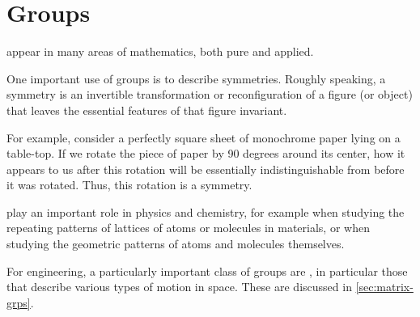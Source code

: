 
\section{Groups}
\label{sec:groups}

 appear in many areas of mathematics, both pure and applied.

One important use of groups is to describe symmetries.
Roughly speaking, a symmetry is an invertible transformation or reconfiguration of a figure (or object) that leaves the essential features of that figure invariant.

For example, consider a perfectly square sheet of monochrome paper lying on a table-top.
If we rotate the piece of paper by 90 degrees around its center, how it appears to us after this rotation will be essentially indistinguishable from before it was rotated.
Thus, this rotation is a symmetry.

 play an important role in physics and chemistry, for example when studying the repeating patterns of lattices of atoms or molecules in materials, or when studying the geometric patterns of atoms and molecules themselves.

For engineering, a particularly important class of groups are , in particular those that describe various types of motion in space.
These are discussed in \cref{sec:matrix-grps}.

